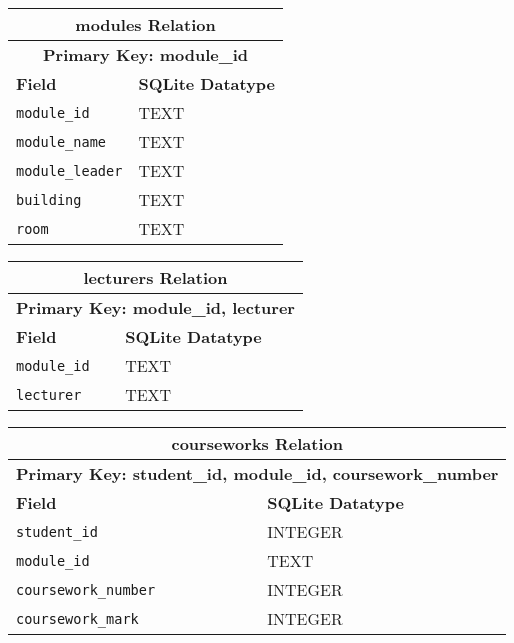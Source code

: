 \documentclass{article}
\begin{document}
\begin{table}[H]
    \centering
    \begin{tabularx}{\textwidth}{|X|X|} %
    \hline
    \multicolumn{2}{|c|}{\textbf{modules Relation}} \\
        \hline
    \multicolumn{2}{|c|}{\textbf{Primary Key: module\_id}} \\
    \hline
        \textbf{Field} & \textbf{SQLite Datatype} \\
        \hline
        \verb|module_id| & TEXT \\
        \hline
        \verb|module_name| & TEXT \\
        \hline
        \verb|module_leader| & TEXT \\
        \hline
        \verb|building| & TEXT \\
        \hline
        \verb|room| & TEXT \\
        \hline
    \end{tabularx}
\end{table}

\begin{table}[H]
    \centering
    \begin{tabularx}{\textwidth}{|X|X|} %
    \hline
    \multicolumn{2}{|c|}{\textbf{lecturers Relation}} \\
        \hline
    \multicolumn{2}{|c|}{\textbf{Primary Key: module\_id, lecturer}} \\
    \hline
        \textbf{Field} & \textbf{SQLite Datatype} \\
        \hline
        \verb|module_id| & TEXT \\
        \hline
        \verb|lecturer| & TEXT \\
        \hline
    \end{tabularx}
\end{table}

\begin{table}[H]
    \centering
    \begin{tabularx}{\textwidth}{|X|X|} %
    \hline
    \multicolumn{2}{|c|}{\textbf{courseworks Relation}} \\
        \hline
    \multicolumn{2}{|c|}{\textbf{Primary Key: student\_id, module\_id, coursework\_number}} \\
    \hline
        \textbf{Field} & \textbf{SQLite Datatype} \\
        \hline
        \verb|student_id| & INTEGER \\
        \hline
        \verb|module_id| & TEXT \\
        \hline
        \verb|coursework_number| & INTEGER \\
        \hline
        \verb|coursework_mark| & INTEGER \\
        \hline
    \end{tabularx}
\end{table}
\end{document}
